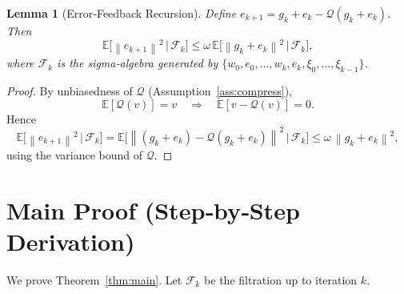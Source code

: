 \documentclass{article}
\newtheorem{lemma}{Lemma}
\newcommand{\E}{\mathbb{E}}
\newcommand{\norm}[1]{\left\|#1\right\|}
\newcommand{\Q}{\mathcal{Q}}
\begin{document}
\begin{lemma}[Error‑Feedback Recursion]\label{lem:ef}
Define $e_{k+1}=g_k+e_k-\Q(g_k+e_k)$. Then
\[
\E\!\big[\norm{e_{k+1}}^{2}\,\big|\,\mathcal{F}_k\big]
\le \omega\,\E\!\big[\norm{g_k+e_k}^{2}\,\big|\,\mathcal{F}_k\big],
\]
where $\mathcal{F}_k$ is the sigma‑algebra generated by $\{w_0,e_0,\dots,w_k,e_k,\xi_0,\dots,\xi_{k-1}\}$.
\end{lemma}
\begin{proof}
By unbiasedness of $\Q$ (Assumption~\ref{ass:compress}),
\[
\E[\Q(v)]=v\quad\Longrightarrow\quad \E[v-\Q(v)]=0.
\]
Hence
\[
\E\!\big[\norm{e_{k+1}}^{2}\,\big|\,\mathcal{F}_k\big]
= \E\!\big[\norm{(g_k+e_k)-\Q(g_k+e_k)}^{2}\,\big|\,\mathcal{F}_k\big]
\le \omega\,\norm{g_k+e_k}^{2},
\]
using the variance bound of $\Q$. \qedhere
\end{proof}

\section*{Main Proof (Step‑by‑Step Derivation)}
We prove Theorem~\ref{thm:main}. Let $\mathcal{F}_k$ be the filtration up to iteration $k$.
\end{document}
